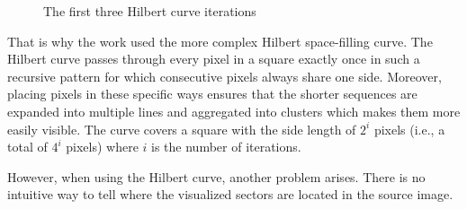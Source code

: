 \documentclass[
  digital, %
  oneside, %
  lof,     %
  lot,     %
]{fithesis4}
\begin{document}
\begin{figure}[H]
\begin{center}
\begin{minipage}{.3\textwidth}
\begin{center}
      \end{center}
    \end{minipage}
  \end{center}
  \caption{The first three Hilbert curve iterations}
  \label{fig:hilbertiters}
\end{figure}

That is why the work \cite{cortesi11} used the more complex Hilbert space-filling curve.
The Hilbert curve passes through every pixel in a square exactly once in such a recursive pattern for which consecutive pixels always share one side.\cite{hilbert91}
Moreover, placing pixels in these specific ways ensures that the shorter sequences are expanded into multiple lines and aggregated into clusters which makes them more easily visible.
The curve covers a square with the side length of $2^i$ pixels (i.e., a total of $4^i$ pixels) where $i$ is the number of iterations.

However, when using the Hilbert curve, another problem arises.
There is no intuitive way to tell where the visualized sectors are located in the source image.
\end{document}
